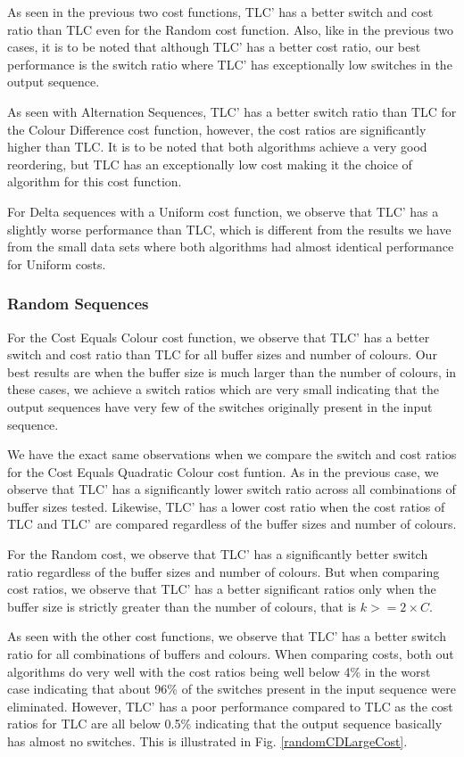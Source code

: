 As seen in the previous two cost functions, TLC' has a better switch and cost ratio than TLC even for the Random cost function. Also, like in the previous two cases, it is to be noted that although TLC' has a better cost ratio, our best performance is the switch ratio where TLC' has exceptionally low switches in the output sequence. 

As seen with Alternation Sequences, TLC' has a better switch ratio than TLC for the Colour Difference cost function, however, the cost ratios are significantly higher than TLC. It is to be noted that both algorithms achieve a very good reordering, but TLC has an exceptionally low cost making it the choice of algorithm for this cost function.

For Delta sequences with a Uniform cost function, we observe that TLC' has a slightly worse performance than TLC, which is different from the results we have from the small data sets where both algorithms had almost identical performance for Uniform costs. 

\subsubsection{Random Sequences}

For the Cost Equals Colour cost function, we observe that TLC' has a  better switch and cost ratio than TLC for all buffer sizes and number of colours. Our best results are when the buffer size is much larger than the number of colours, in these cases, we achieve a switch ratios which are very small indicating that the output sequences have very few of the switches originally present in the input sequence. 

We have the exact same observations when we compare the switch and cost ratios for the Cost Equals Quadratic Colour cost funtion. As in the previous case, we observe that TLC' has a significantly lower switch ratio across all combinations of buffer sizes tested. Likewise, TLC' has a lower cost ratio when the cost ratios of TLC and TLC' are compared regardless of the buffer sizes and number of colours. 

For the Random cost, we observe that TLC' has a significantly better  switch ratio regardless of the buffer sizes and number of colours. But when comparing cost ratios, we observe that TLC' has a better significant ratios only when the buffer size is strictly greater than the number of colours, that is $k >= 2 \times C$.

As seen with the other cost functions, we observe that TLC' has a better switch ratio for all combinations of buffers and colours. When comparing costs, both out algorithms do very well with the cost ratios being well below 4\% in the worst case indicating that about 96\% of the switches present in the input sequence were eliminated. However, TLC' has a poor performance compared to TLC as the cost ratios for TLC are all below 0.5\% indicating that the output sequence basically has almost no switches. This is illustrated in Fig. \ref{randomCDLargeCost}.

